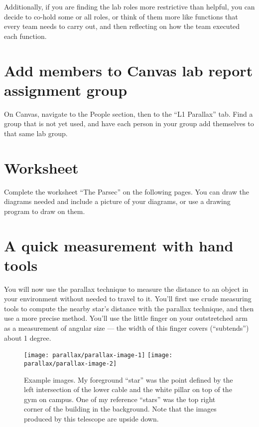 Additionally, if you are finding the lab roles more restrictive than helpful, you can decide to co-hold some or all roles, or think of them more like functions that every team needs to carry out, and then reflecting on how the team executed each function.

\section{Add members to Canvas lab report assignment group}

\begin{steps}
	\item On Canvas, navigate to the People section, then to the ``L1 Parallax'' tab. Find a group that is not yet used, and have each person in your group add themselves to that same lab group.
\end{steps}

\section{Worksheet}

Complete the worksheet ``The Parsec'' on the following pages. You can draw the diagrams needed and include a picture of your diagrams, or use a drawing program to draw on them.



\section{A quick measurement with hand tools}

You will now use the parallax technique to measure the distance to an object in your environment without needed to travel to it. You'll first use crude measuring tools to compute the nearby star's distance with the parallax technique, and then use a more precise method. You'll use the little finger on your outstretched arm as a measurement of angular size --- the width of this finger covers (``subtends'') about 1 degree.

\begin{figure}
	\texttt{[image: parallax/parallax-image-1]}
	\texttt{[image: parallax/parallax-image-2]}
	\caption{Example images. My foreground ``star'' was the point defined by the left intersection of the lower cable and the white pillar on top of the gym on campus. One of my reference ``stars'' was the top right corner of the building in the background. Note that the images produced by this telescope are upside down.}\label{par:fig:images}
\end{figure}

